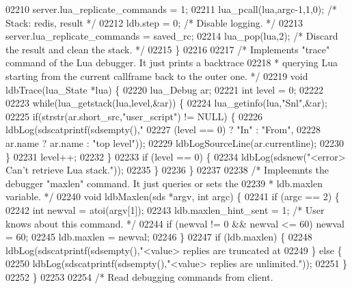 \begin{DoxyCode}
{{{{{{{{{{{{{{{{{{{{{{02210     server.lua\_replicate\_commands = 1;
02211     lua\_pcall(lua,argc-1,1,0);  \textcolor{comment}{/* Stack: redis, result */}
02212     ldb.step = 0;               \textcolor{comment}{/* Disable logging. */}
02213     server.lua\_replicate\_commands = saved\_rc;
02214     lua\_pop(lua,2);             \textcolor{comment}{/* Discard the result and clean the stack. */}
02215 \}
02216 
02217 \textcolor{comment}{/* Implements "trace" command of the Lua debugger. It just prints a backtrace}
02218 \textcolor{comment}{ * querying Lua starting from the current callframe back to the outer one. */}
02219 \textcolor{keywordtype}{void} ldbTrace(lua\_State *lua) \{
02220     lua\_Debug ar;
02221     \textcolor{keywordtype}{int} level = 0;
02222 
02223     \textcolor{keywordflow}{while}(lua\_getstack(lua,level,&ar)) \{
02224         lua\_getinfo(lua,\textcolor{stringliteral}{"Snl"},&ar);
02225         \textcolor{keywordflow}{if}(strstr(ar.short\_src,\textcolor{stringliteral}{"user\_script"}) != NULL) \{
02226             ldbLog(sdscatprintf(sdsempty(),\textcolor{stringliteral}{"%
02227                 (level == 0) ? \textcolor{stringliteral}{"In"} : \textcolor{stringliteral}{"From"},
02228                 ar.name ? ar.name : \textcolor{stringliteral}{"top level"}));
02229             ldbLogSourceLine(ar.currentline);
02230         \}
02231         level++;
02232     \}
02233     \textcolor{keywordflow}{if} (level == 0) \{
02234         ldbLog(sdsnew(\textcolor{stringliteral}{"<error> Can't retrieve Lua stack."}));
02235     \}
02236 \}
02237 
02238 \textcolor{comment}{/* Impleemnts the debugger "maxlen" command. It just queries or sets the}
02239 \textcolor{comment}{ * ldb.maxlen variable. */}
02240 \textcolor{keywordtype}{void} ldbMaxlen(sds *argv, \textcolor{keywordtype}{int} argc) \{
02241     \textcolor{keywordflow}{if} (argc == 2) \{
02242         \textcolor{keywordtype}{int} newval = atoi(argv[1]);
02243         ldb.maxlen\_hint\_sent = 1; \textcolor{comment}{/* User knows about this command. */}
02244         \textcolor{keywordflow}{if} (newval != 0 && newval <= 60) newval = 60;
02245         ldb.maxlen = newval;
02246     \}
02247     \textcolor{keywordflow}{if} (ldb.maxlen) \{
02248         ldbLog(sdscatprintf(sdsempty(),\textcolor{stringliteral}{"<value> replies are truncated at %
02249     \} \textcolor{keywordflow}{else} \{
02250         ldbLog(sdscatprintf(sdsempty(),\textcolor{stringliteral}{"<value> replies are unlimited."}));
02251     \}
02252 \}
02253 
02254 \textcolor{comment}{/* Read debugging commands from client.}
}}}}}}}}}}}}}}}}}}}}}}}}
\end{DoxyCode}

